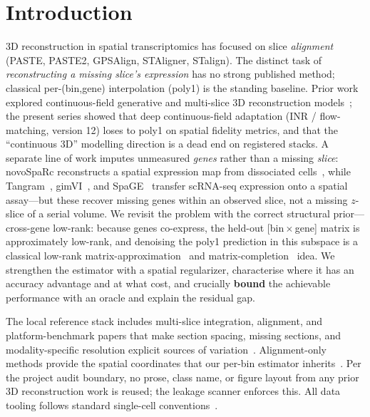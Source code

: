 \documentclass[10pt,letterpaper]{article}
\begin{document}
\section{Introduction}
\label{sec:intro}

3D reconstruction in spatial transcriptomics has focused on slice \emph{alignment} (PASTE,
PASTE2, GPSAlign, STAligner, STalign). The distinct task of \emph{reconstructing a missing
slice's expression} has no strong published method; classical per-(bin,gene) interpolation
(poly1) is the standing baseline. Prior work explored continuous-field generative and
multi-slice 3D reconstruction
models~\cite{Wang2023STitch3D}; the present series showed that deep continuous-field
adaptation (INR / flow-matching, version 12) loses to poly1 on spatial fidelity metrics,
and that the ``continuous 3D'' modelling direction is a dead end on registered stacks.
A separate line of work imputes unmeasured \emph{genes} rather than a missing \emph{slice}:
novoSpaRc reconstructs a spatial expression map from dissociated
cells~\cite{novosparc}, while Tangram~\cite{tangram}, gimVI~\cite{gimvi}, and
SpaGE~\cite{spage} transfer scRNA-seq expression onto a spatial assay---but these recover
missing genes within an observed slice, not a missing $z$-slice of a serial volume.
We revisit the problem with the correct structural prior---cross-gene low-rank: because
genes co-express, the held-out [bin\,$\times$\,gene] matrix is approximately low-rank, and
denoising the poly1 prediction in this subspace is a classical low-rank
matrix-approximation~\cite{eckartyoung} and matrix-completion~\cite{matrixcompletion}
idea. We strengthen the estimator with a spatial regularizer, characterise where it has an
accuracy advantage and at what cost, and crucially \textbf{bound} the achievable performance
with an oracle and explain the residual gap.

The local reference stack includes multi-slice integration, alignment, and
platform-benchmark papers that make section spacing, missing sections, and
modality-specific resolution explicit sources of
variation~\cite{Dong2025MultisliceBenchmark,
ClusteringIntegrationBenchmark2024,You2024SequencingST,Cervilla2026SixCancerPlatforms}.
Alignment-only methods provide the spatial coordinates that our per-bin estimator
inherits~\cite{Zeira2022PASTE,Liu2023PASTE2,Zhou2023STAligner,Jones2023GPSA,Clifton2023STalign}.
Per the project audit boundary, no prose, class name, or figure layout
from any prior 3D reconstruction work is reused; the leakage scanner enforces this.
All data tooling follows standard single-cell conventions~\cite{Wolf2018Scanpy}.
\end{document}
